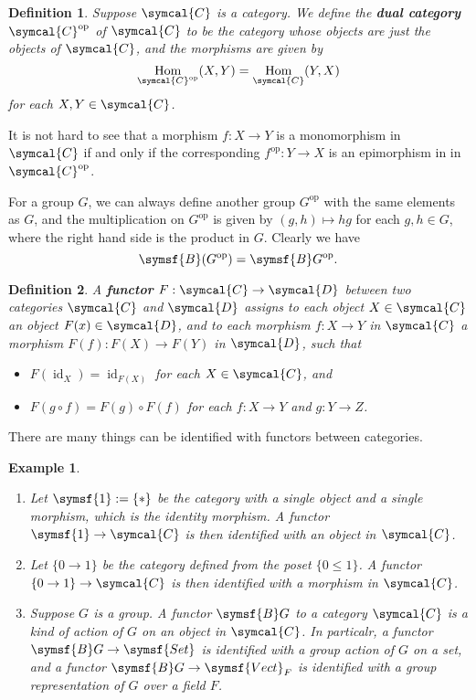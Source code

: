 \documentclass{article}
\theoremstyle{theorem}
\newtheorem{definition}{Definition}[section]
\newtheorem{example}{Example}[section]
\theoremstyle{remark}
\def\calC{{\symcal{C}}}
\def\calD{{\symcal{D}}}
\DeclareMathOperator{\Hom}{Hom}
\DeclareMathOperator{\id}{id}
\DeclareMathOperator{\op}{op}
\begin{document}
\begin{definition}
    Suppose $\calC$ is a category. We define the \textbf{dual category} $\calC^{\op}$ of $\calC$ to be the category whose objects are just the objects of $\calC$, and the morphisms are given by $$\Hom_{\calC^{\op}}(X, Y) = \Hom_\calC(Y, X)$$ for each $X, Y \in \calC$. 
\end{definition}

It is not hard to see that a morphism $f : X \to Y$ is a monomorphism in $\calC$ if and only if the corresponding $f^{\op}: Y \to X$ is an epimorphism in in $\calC^{\op}$. 

For a group $G$, we can always define another group $G^{\op}$ with the same elements as $G$, and the multiplication on $G^{\op}$ is given by $(g, h) \mapsto hg$ for each $g, h \in G$, where the right hand side is the product in $G$. Clearly we have $$\symsf{B}(G^{\op}) = \symsf{B}G^{\op}.$$

\begin{definition}
    A \textbf{functor} $F : \calC \to \calD$ between two categories $\calC$ and $\calD$ assigns to each object $X \in \calC$ an object $F(x) \in \calD$, and to each morphism $f : X \to Y$ in $\calC$ a morphism $F(f) : F(X) \to F(Y)$ in $\calD$, such that 
    \begin{itemize}
        \item $F(\id_X) = \id_{F(X)}$ for each $X \in \calC$, and 
        \item $F(g \circ f) = F(g) \circ F(f)$ for each $f : X \to Y$ and $g : Y \to Z$.
    \end{itemize}
\end{definition}

There are many things can be identified with functors between categories. 

\begin{example}
    \begin{enumerate}
        \item Let $\symsf{1} := \{\ast\}$ be the category with a single object and a single morphism, which is the identity morphism. A functor $\symsf{1} \to \calC$ is then identified with an object in $\calC$.
        \item Let $\{ 0 \to 1 \}$ be the category defined from the poset $\{0 \leq 1\}$. A functor $\{0 \to 1\} \to \calC$ is then identified with a morphism in $\calC$. 
        \item Suppose $G$ is a group. A functor $\symsf{B}G$ to a category $\calC$ is a kind of action of $G$ on an object in $\calC$. In particalr, a functor $\symsf{B}G \to \symsf{Set}$ is identified with a group action of $G$ on a set, and a functor $\symsf{B}G \to \symsf{Vect}_F$ is identified with a group representation of $G$ over a field $F$. 
    \end{enumerate}
\end{example}
\end{document}
